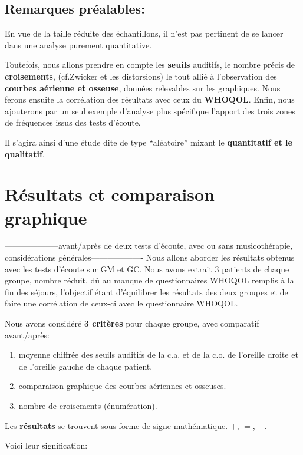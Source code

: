 \subsection{Remarques préalables: }
En vue de la taille réduite des échantillons, il n'est pas
pertinent de se lancer dans une analyse purement
quantitative.

Toutefois, nous 
allons prendre en compte les \textbf{seuils} auditifs, le nombre précis de
\textbf{croisements}, (cf.Zwicker et les distorsions)
 le tout allié à l'observation 
des \textbf{courbes aérienne et osseuse}, 
données relevables sur les
graphiques.
Nous ferons ensuite la corrélation des résultats avec ceux du\textbf{ WHOQOL}.
Enfin, nous ajouterons par un seul exemple d'analyse plus spécifique l'apport des trois zones de fréquences issus des tests d'écoute.

Il s'agira  ainsi d'une étude dite de type  ``aléatoire'' mixant le \textbf{quantitatif  et le qualitatif}.




\section{Résultats et comparaison graphique }
--------------------avant/après de deux tests d'écoute, avec ou sans
  musicothérapie, considérations générales-------------------
Nous allons aborder les résultats obtenus avec les tests d'écoute sur
GM et GC.
Nous avons extrait 3 patients de chaque groupe, nombre réduit, dû au
manque de questionnaires WHOQOL remplis à la fin des séjours, l'objectif
étant d'équilibrer les résultats des deux groupes et de faire une corrélation de ceux-ci avec le questionnaire
WHOQOL.

Nous avons considéré \textbf{ 3 critères} pour chaque groupe, avec comparatif avant/après:
\begin{enumerate}
 \item  moyenne chiffrée des seuils
auditifs de la c.a. et de la c.o. de l'oreille droite et de l'oreille gauche de chaque patient.

\item comparaison graphique des courbes aériennes et osseuses.

\item  nombre de croisements (énumération).
\end{enumerate}

Les \textbf{résultats} se trouvent sous forme de signe mathématique. $+$, $=$, $-$.

Voici leur signification:

